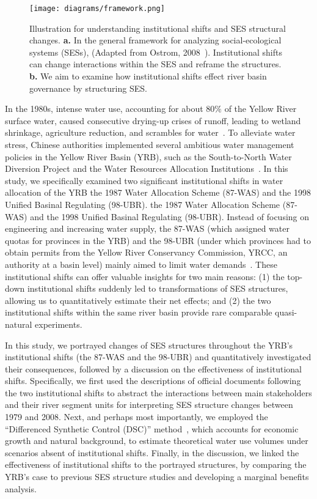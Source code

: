 \documentclass[preprint, 12pt]{elsarticle}
\begin{document}
\begin{figure}[!ht]
	\centering
	\texttt{[image: diagrams/framework.png]}
	\caption{
		Illustration for understanding institutional shifts and SES structural changes. \textbf{a.} In the general framework for analyzing social-ecological systems (SESs), (Adapted from Ostrom, 2008~\cite{ostrom2009}). Institutional shifts can change interactions within the SES and reframe the structures.  \textbf{b.} We aim to examine how institutional shifts effect river basin governance by structuring SES.}\label{fig:framework}
\end{figure}

In the 1980s, intense water use, accounting for about $80\%$ of the Yellow River surface water, caused consecutive drying-up crises of runoff, leading to wetland shrinkage, agriculture reduction, and scrambles for water~\cite{wohlfart2016}.
To alleviate water stress, Chinese authorities implemented several ambitious water management policies in the Yellow River Basin (YRB), such as the South-to-North Water Diversion Project and the Water Resources Allocation Institutions~\cite{long2020, wang2019d}.
In this study, we specifically examined two significant institutional shifts in water allocation of the YRB\: the 1987 Water Allocation Scheme (87-WAS) and the 1998 Unified Basinal Regulating (98-UBR).
the 1987 Water Allocation Scheme (87-WAS) and the 1998 Unified Basinal Regulating (98-UBR).
Instead of focusing on engineering and increasing water supply, the 87-WAS (which assigned water quotas for provinces in the YRB) and the 98-UBR (under which provinces had to obtain permits from the Yellow River Conservancy Commission, YRCC, an authority at a basin level) mainly aimed to limit water demands~\cite{bouckaert2022, speed2013}.
These institutional shifts can offer valuable insights for two main reasons:
(1) the top-down institutional shifts suddenly led to transformations of SES structures, allowing us to quantitatively estimate their net effects; and (2) the two institutional shifts within the same river basin provide rare comparable quasi-natural experiments.

In this study, we portrayed changes of SES structures throughout the YRB's institutional shifts (the 87-WAS and the 98-UBR) and quantitatively investigated their consequences, followed by a discussion on the effectiveness of institutional shifts.
Specifically, we first used the descriptions of official documents following the two institutional shifts to abstract the interactions between main stakeholders and their river segment units for interpreting SES structure changes between 1979 and 2008.
Next, and perhaps most importantly, we employed the ``Differenced Synthetic Control (DSC)'' method~\cite{arkhangelsky2021}, which accounts for economic growth and natural background, to estimate theoretical water use volumes under scenarios absent of institutional shifts.
Finally, in the discussion, we linked the effectiveness of institutional shifts to the portrayed structures, by comparing the YRB's case to previous SES structure studies and developing a marginal benefits analysis.
\end{document}

